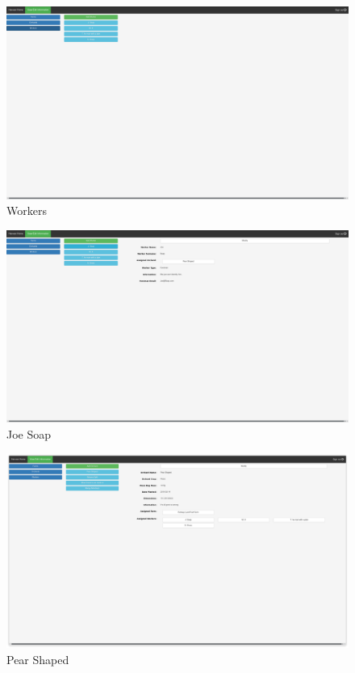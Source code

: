 \documentclass[11pt]{article}
\begin{document}
\begin{figure}
 \centering
 \includegraphics[width=12cm, keepaspectratio]{Images/Information-Workers.png}
 \caption{Workers}
 \label{InformationPageWorkers}
\end{figure}

\begin{figure}
 \centering
 \includegraphics[width=12cm, keepaspectratio]{Images/Information-Joe.png}
 \caption{Joe Soap}
 \label{InformationPageJoe}
\end{figure}

\begin{figure}
 \centering
 \includegraphics[width=12cm, keepaspectratio]{Images/Information-Pear.png}
 \caption{Pear Shaped}
 \label{InformationPagePear}
\end{figure}
\end{document}
